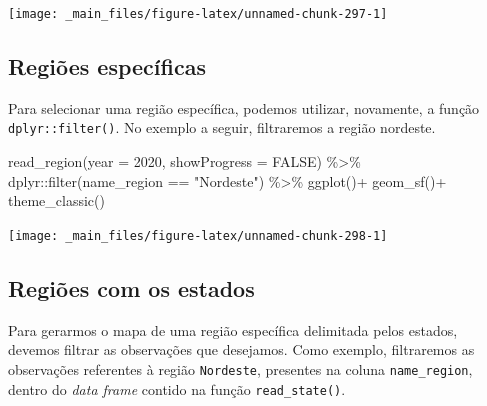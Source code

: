 \documentclass[
  brazilian,
]{book}
\newenvironment{Shaded}{\begin{snugshade}}{\end{snugshade}}
\newcommand{\AttributeTok}[1]{\textcolor[rgb]{0.77,0.63,0.00}{#1}}
\newcommand{\ConstantTok}[1]{\textcolor[rgb]{0.00,0.00,0.00}{#1}}
\newcommand{\DecValTok}[1]{\textcolor[rgb]{0.00,0.00,0.81}{#1}}
\newcommand{\FunctionTok}[1]{\textcolor[rgb]{0.00,0.00,0.00}{#1}}
\newcommand{\NormalTok}[1]{#1}
\newcommand{\SpecialCharTok}[1]{\textcolor[rgb]{0.00,0.00,0.00}{#1}}
\newcommand{\StringTok}[1]{\textcolor[rgb]{0.31,0.60,0.02}{#1}}
\begin{document}
\begin{center}\texttt{[image: \_main\_files/figure-latex/unnamed-chunk-297-1]} \end{center}

\hypertarget{regiuxf5es-especuxedficas}{%
\subsection{Regiões específicas}\label{regiuxf5es-especuxedficas}}

Para selecionar uma região específica, podemos utilizar, novamente, a função \texttt{dplyr::filter()}. No exemplo a seguir, filtraremos a região nordeste.

\begin{Shaded}
\begin{Highlighting}[]
\FunctionTok{read\_region}\NormalTok{(}\AttributeTok{year =} \DecValTok{2020}\NormalTok{,}
            \AttributeTok{showProgress =} \ConstantTok{FALSE}\NormalTok{) }\SpecialCharTok{\%\textgreater{}\%} 
\NormalTok{  dplyr}\SpecialCharTok{::}\FunctionTok{filter}\NormalTok{(name\_region }\SpecialCharTok{==} \StringTok{"Nordeste"}\NormalTok{) }\SpecialCharTok{\%\textgreater{}\%} 
  \FunctionTok{ggplot}\NormalTok{()}\SpecialCharTok{+}
  \FunctionTok{geom\_sf}\NormalTok{()}\SpecialCharTok{+}
  \FunctionTok{theme\_classic}\NormalTok{()}
\end{Highlighting}
\end{Shaded}

\begin{center}\texttt{[image: \_main\_files/figure-latex/unnamed-chunk-298-1]} \end{center}

\hypertarget{regiuxf5es-com-os-estados}{%
\subsection{Regiões com os estados}\label{regiuxf5es-com-os-estados}}

Para gerarmos o mapa de uma região específica delimitada pelos estados, devemos filtrar as observações que desejamos. Como exemplo, filtraremos as observações referentes à região \texttt{Nordeste}, presentes na coluna \texttt{name\_region}, dentro do \emph{data frame} contido na função \texttt{read\_state()}.
\end{document}
